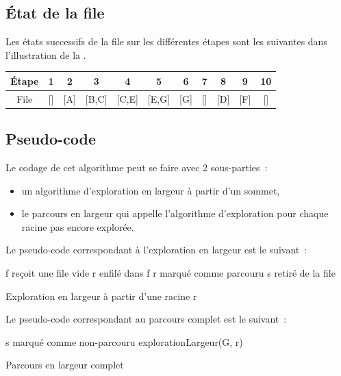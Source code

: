 \documentclass[11pt]{article}
\begin{document}
\subsection{État de la file}

Les états successifs de la file sur les différentes étapes sont les suivantes dans l'illustration de la .

\begin{center}
	\begin{tabular}{|c|c|c|c|c|c|c|c|c|c|c|}
		\hline
		Étape & 1 & 2 & 3 & 4 & 5 & 6 & 7 & 8 & 9 & 10 \\
		\hline
		File & [] & [A] & [B,C] & [C,E] & [E,G] & [G] & [] & [D] & [F] & [] \\
		\hline
	\end{tabular}
\end{center}

\newpage

\subsection{Pseudo-code}

Le codage de cet algorithme peut se faire avec 2 sous-parties~: 
\begin{itemize}
	\item un algorithme d'exploration en largeur à partir d'un sommet, 
	\item le parcours en largeur qui appelle l'algorithme d'exploration pour chaque racine pas encore explorée.
\end{itemize}

Le pseudo-code correspondant à l'exploration en largeur est le suivant~:
\begin{algorithm}
	f reçoit une file vide\;
	r enfilé dans f \;
	r marqué comme parcouru \;
	{
		s retiré de la file\;
		{
		}
	}
\caption{Exploration en largeur à partir d'une racine r}
\end{algorithm}

Le pseudo-code correspondant au parcours complet est le suivant~:
\begin{algorithm}
	{
		s marqué comme non-parcouru\;
	}
	{
		{
			explorationLargeur(G, r) \;
		}
	}
\caption{Parcours en largeur complet}
\end{algorithm}
\end{document}
